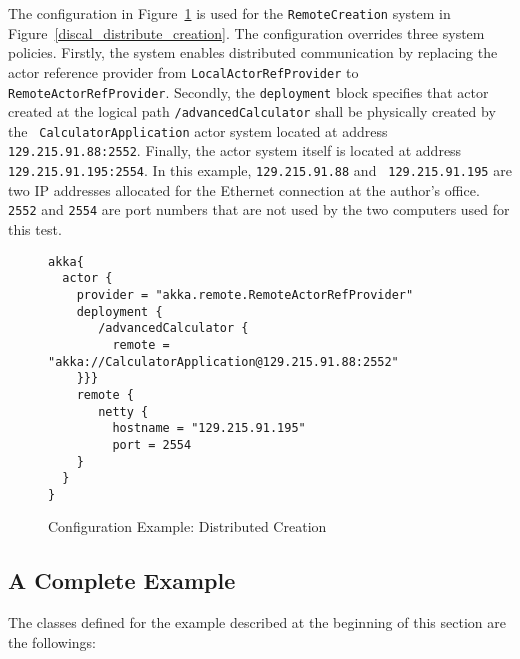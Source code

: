 The configuration in Figure~\ref{discal_distribute_configuration} is used 
for the {\tt RemoteCreation} system in Figure~\ref{discal_distribute_creation}. 
The configuration overrides three system policies.  Firstly, the system enables 
distributed communication by replacing the actor reference provider from 
{\tt LocalActorRefProvider} to {\tt RemoteActorRefProvider}.  Secondly, the 
{\tt deployment} block specifies that actor created at the logical path  
{\tt /advancedCalculator} shall be physically created by the {\tt 
CalculatorApplication} actor system located at address {\tt 
129.215.91.88:2552}.  Finally, the actor system itself is located at address
{\tt 129.215.91.195:2554}.   In this example, {\tt 129.215.91.88} and {\tt 
129.215.91.195} are two IP addresses allocated for the Ethernet connection at 
the author's office.  {\tt 2552} and {\tt 2554} are port numbers that are not 
used by the two computers used for this test.


\begin{figure}[h]
\begin{lstlisting}
akka{
  actor {
    provider = "akka.remote.RemoteActorRefProvider"
    deployment {
       /advancedCalculator {
         remote = "akka://CalculatorApplication@129.215.91.88:2552"
    }}}
    remote {
       netty {
         hostname = "129.215.91.195"
         port = 2554               
    }
  }
}
\end{lstlisting}
\caption{Configuration Example: Distributed Creation}
\label{discal_distribute_configuration}
\end{figure}

\subsection{A Complete Example}

The classes defined for the example described at the beginning of this section 
are the followings:


